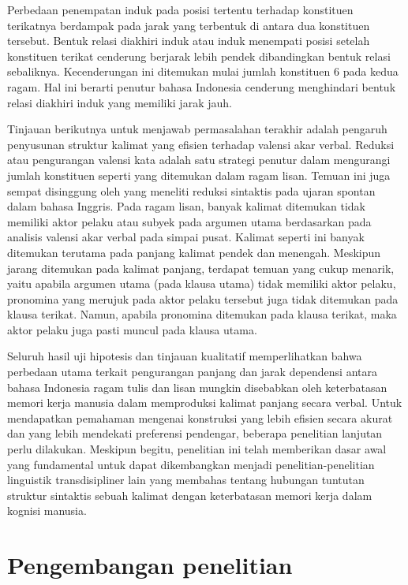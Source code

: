 Perbedaan penempatan induk pada posisi tertentu terhadap konstituen terikatnya berdampak pada jarak yang terbentuk di antara dua konstituen tersebut. Bentuk relasi diakhiri induk atau induk menempati posisi setelah konstituen terikat cenderung berjarak lebih pendek dibandingkan bentuk relasi sebaliknya. Kecenderungan ini ditemukan mulai jumlah konstituen 6 pada kedua ragam. Hal ini berarti penutur bahasa Indonesia cenderung menghindari bentuk relasi diakhiri induk yang memiliki jarak jauh.

Tinjauan berikutnya untuk menjawab permasalahan terakhir adalah pengaruh penyusunan struktur kalimat yang efisien terhadap valensi akar verbal. Reduksi atau pengurangan valensi kata adalah satu strategi penutur dalam mengurangi jumlah konstituen seperti yang ditemukan dalam ragam lisan. Temuan ini juga sempat disinggung oleh \cite{jaeger2006redundancy} yang meneliti reduksi sintaktis pada ujaran spontan dalam bahasa Inggris. Pada ragam lisan, banyak kalimat ditemukan tidak memiliki aktor pelaku atau subyek pada argumen utama berdasarkan pada analisis valensi akar verbal pada simpai pusat. Kalimat seperti ini banyak ditemukan terutama pada panjang kalimat pendek dan menengah. Meskipun jarang ditemukan pada kalimat panjang, terdapat temuan yang cukup menarik, yaitu apabila argumen utama (pada klausa utama) tidak memiliki aktor pelaku, pronomina yang merujuk pada aktor pelaku tersebut juga tidak ditemukan pada klausa terikat. Namun, apabila pronomina ditemukan pada klausa terikat, maka aktor pelaku juga pasti muncul pada klausa utama. 

Seluruh hasil uji hipotesis dan tinjauan kualitatif memperlihatkan bahwa perbedaan utama terkait pengurangan panjang dan jarak dependensi antara bahasa Indonesia ragam tulis dan lisan mungkin disebabkan oleh keterbatasan memori kerja manusia dalam memproduksi kalimat panjang secara verbal. Untuk mendapatkan pemahaman mengenai konstruksi yang lebih efisien secara akurat dan yang lebih mendekati preferensi pendengar, beberapa penelitian lanjutan perlu dilakukan. Meskipun begitu, penelitian ini telah memberikan dasar awal yang fundamental untuk dapat dikembangkan menjadi penelitian-penelitian linguistik transdisipliner lain yang membahas tentang hubungan tuntutan struktur sintaktis sebuah kalimat dengan keterbatasan memori kerja dalam kognisi manusia.

\section{Pengembangan penelitian}

